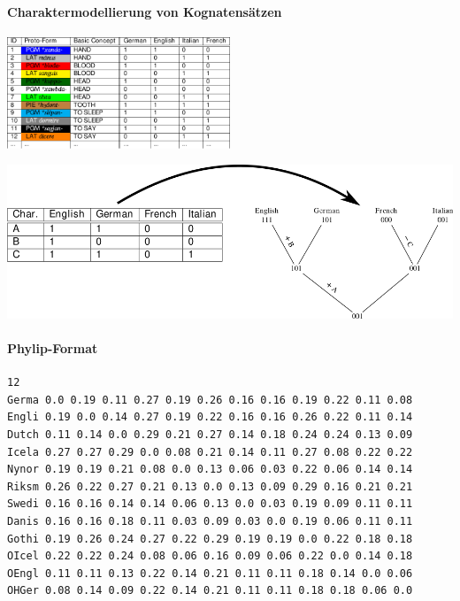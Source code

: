 \paragraph{Charaktermodellierung von Kognatensätzen}
\begin{center}
\includegraphics[width=0.5\textwidth]{img/cognates-2.pdf}
\end{center}




\begin{center}
\includegraphics[width=\textwidth]{img/character-tree.png}
\end{center}




\paragraph{Phylip-Format}

\begin{verbatim}
12
Germa 0.0 0.19 0.11 0.27 0.19 0.26 0.16 0.16 0.19 0.22 0.11 0.08
Engli 0.19 0.0 0.14 0.27 0.19 0.22 0.16 0.16 0.26 0.22 0.11 0.14
Dutch 0.11 0.14 0.0 0.29 0.21 0.27 0.14 0.18 0.24 0.24 0.13 0.09
Icela 0.27 0.27 0.29 0.0 0.08 0.21 0.14 0.11 0.27 0.08 0.22 0.22
Nynor 0.19 0.19 0.21 0.08 0.0 0.13 0.06 0.03 0.22 0.06 0.14 0.14
Riksm 0.26 0.22 0.27 0.21 0.13 0.0 0.13 0.09 0.29 0.16 0.21 0.21
Swedi 0.16 0.16 0.14 0.14 0.06 0.13 0.0 0.03 0.19 0.09 0.11 0.11
Danis 0.16 0.16 0.18 0.11 0.03 0.09 0.03 0.0 0.19 0.06 0.11 0.11
Gothi 0.19 0.26 0.24 0.27 0.22 0.29 0.19 0.19 0.0 0.22 0.18 0.18
OIcel 0.22 0.22 0.24 0.08 0.06 0.16 0.09 0.06 0.22 0.0 0.14 0.18
OEngl 0.11 0.11 0.13 0.22 0.14 0.21 0.11 0.11 0.18 0.14 0.0 0.06
OHGer 0.08 0.14 0.09 0.22 0.14 0.21 0.11 0.11 0.18 0.18 0.06 0.0
\end{verbatim}





